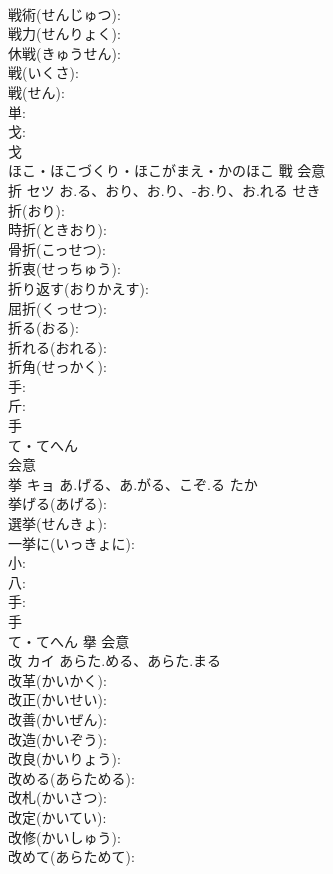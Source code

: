 \documentclass[8pt]{extreport}
\begin{document}
\begin{CJK}{UTF8}{min}
\\	戦術(せんじゅつ): 
\\	戦力(せんりょく): 
\\	休戦(きゅうせん): 
\\	戦(いくさ): 
\\	戦(せん): 
\\	単: 
\\	戈: 
\\	戈	
\\	ほこ・ほこづくり・ほこがまえ・かのほこ	戰	会意 
\\	折	セツ	お.る、おり、お.り、-お.り、お.れる	せき	
\\	折(おり): 
\\	時折(ときおり): 
\\	骨折(こっせつ): 
\\	折衷(せっちゅう): 
\\	折り返す(おりかえす): 
\\	屈折(くっせつ): 
\\	折る(おる): 
\\	折れる(おれる): 
\\	折角(せっかく): 
\\	手: 
\\	斤: 
\\	手	
\\	て・てへん	
\\	会意 
\\	挙	キョ	あ.げる、あ.がる、こぞ.る	たか	
\\	挙げる(あげる): 
\\	選挙(せんきょ): 
\\	一挙に(いっきょに): 
\\	小: 
\\	八: 
\\	手: 
\\	手	
\\	て・てへん	擧	会意 
\\	改	カイ	あらた.める、あらた.まる		
\\	改革(かいかく): 
\\	改正(かいせい): 
\\	改善(かいぜん): 
\\	改造(かいぞう): 
\\	改良(かいりょう): 
\\	改める(あらためる): 
\\	改札(かいさつ): 
\\	改定(かいてい): 
\\	改修(かいしゅう): 
\\	改めて(あらためて): 

\end{CJK}
\end{document}
